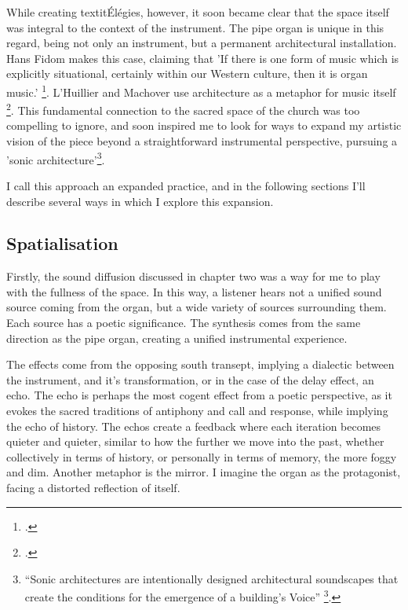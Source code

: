 \documentclass[12pt,twoside,maitrise]{dms_ks}
\theoremstyle{definition}
\begin{document}
While creating textit{Élégies}, however, it soon became clear that the space itself was integral to the context of the instrument. 
The pipe organ is unique in this regard, being not only an instrument, but a permanent architectural installation. 
Hans Fidom makes this case, claiming that 'If there is one form of music which is explicitly situational, certainly within our Western culture, then it is organ music.' \footcite[23]{fidom_music_2012}. 
L'Huillier and Machover use architecture as a metaphor for music itself \footcite[361]{lhuillier_spaces_2018}. 
This fundamental connection to the sacred space of the church was too compelling to ignore, and soon inspired me to look for ways to expand my artistic vision of the piece beyond a straightforward instrumental perspective, pursuing a 'sonic architecture'\footnote{“Sonic architectures are intentionally designed architectural soundscapes that create the conditions for the emergence of a building’s Voice” \footcite{lacey_site-specific_2014}.}.

I call this approach an expanded practice, and in the following sections I'll describe several ways in which I explore this expansion.

\subsection{Spatialisation}

Firstly, the sound diffusion discussed in chapter two was a way for me to play with the fullness of the space. 
In this way, a listener hears not a unified sound source coming from the organ, but a wide variety of sources surrounding them. 
Each source has a poetic significance. 
The synthesis comes from the same direction as the pipe organ, creating a unified instrumental experience.

The effects come from the opposing south transept, implying a dialectic between the instrument, and it's transformation, or in the case of the delay effect, an echo. 
The echo is perhaps the most cogent effect from a poetic perspective, as it evokes the sacred traditions of antiphony and call and response, while implying the echo of history. 
The echos create a feedback where each iteration becomes quieter and quieter, similar to how the further we move into the past, whether collectively in terms of history, or personally in terms of memory, the more foggy and dim. 
Another metaphor is the mirror. 
I imagine the organ as the protagonist, facing a distorted reflection of itself.
\end{document}
